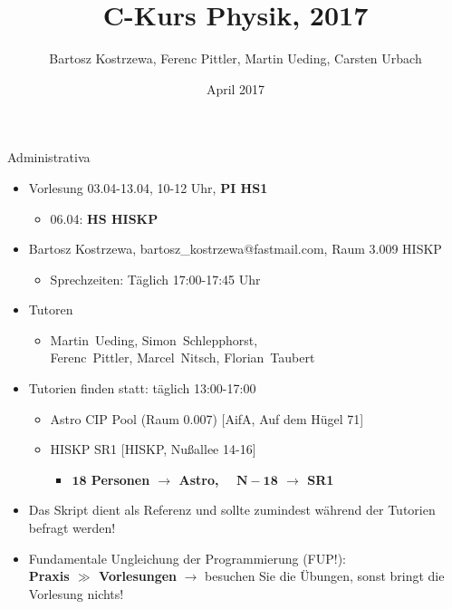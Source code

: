 \documentclass[xcolor=dvipsnames]{beamer}
\author[B. Kostrzewa]{Bartosz Kostrzewa, Ferenc Pittler, Martin Ueding, Carsten Urbach}
\title{C-Kurs Physik, 2017}
\institute[HISKP]{HISKP, Rheinische Friedrich-Wilhelms-Universität Bonn}
\date[April 2017]{April 2017}
\begin{document}
\begin{frame}
 \titlepage
\end{frame}

\begin{frame}{Administrativa}
  \begin{itemize}
  \item{Vorlesung 03.04-13.04, 10-12 Uhr, \textbf{PI HS1}}
  \begin{itemize}
    \item{06.04: \textbf{HS HISKP} }
  \end{itemize}
  \vspace{0.2cm}
  \item{Bartosz Kostrzewa, bartosz\_kostrzewa@fastmail.com, Raum 3.009 HISKP}
  \begin{itemize}
    \item{Sprechzeiten: Täglich 17:00-17:45 Uhr}
  \end{itemize}
  \vspace{0.2cm}
  \item{Tutoren}
  \begin{itemize}
    \item{Martin~Ueding, Simon~Schlepphorst, 
         \\Ferenc~Pittler, Marcel~Nitsch, Florian~Taubert} 
  \end{itemize}
  \vspace{0.2cm}
  \item{Tutorien finden statt: täglich 13:00-17:00}
  \begin{itemize}
    \item{Astro CIP Pool (Raum 0.007) [AifA, Auf dem Hügel 71]}
    \item{HISKP SR1 [HISKP, Nußallee 14-16]}
    \begin{itemize}
      \item{\textbf{ $\mathbf{18}$ Personen $\rightarrow$ Astro, $\quad\mathbf{N-18}$ $\rightarrow$ SR1} }
    \end{itemize}
  \end{itemize}
  \vspace{0.2cm}
  \item{Das Skript dient als Referenz und sollte zumindest während der Tutorien befragt werden!}
  \vspace{0.2cm}
  \item{Fundamentale Ungleichung der Programmierung (FUP!): \\ \textbf{Praxis $\mathbf{\gg}$ Vorlesungen} $\rightarrow$ besuchen Sie die Übungen, sonst bringt die Vorlesung nichts!}
  \end{itemize}
\end{frame}
\end{document}
